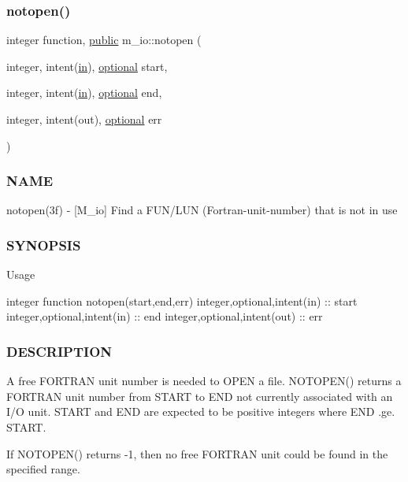 \subsubsection{\texorpdfstring{notopen()}{notopen()}}
{\footnotesize\ttfamily integer function, \hyperlink{M__stopwatch_83_8txt_a2f74811300c361e53b430611a7d1769f}{public} m\+\_\+io\+::notopen (\begin{DoxyParamCaption}\item[{integer, intent(\hyperlink{M__journal_83_8txt_afce72651d1eed785a2132bee863b2f38}{in}), \hyperlink{option__stopwatch_83_8txt_aa4ece75e7acf58a4843f70fe18c3ade5}{optional}}]{start,  }\item[{integer, intent(\hyperlink{M__journal_83_8txt_afce72651d1eed785a2132bee863b2f38}{in}), \hyperlink{option__stopwatch_83_8txt_aa4ece75e7acf58a4843f70fe18c3ade5}{optional}}]{end,  }\item[{integer, intent(out), \hyperlink{option__stopwatch_83_8txt_aa4ece75e7acf58a4843f70fe18c3ade5}{optional}}]{err }\end{DoxyParamCaption})}



\subsubsection*{N\+A\+ME}

notopen(3f) -\/ \mbox{[}M\+\_\+io\mbox{]} Find a F\+U\+N/\+L\+UN (Fortran-\/unit-\/number) that is not in use \subsubsection*{S\+Y\+N\+O\+P\+S\+IS}

Usage

integer function notopen(start,end,err) integer,optional,intent(in) \+:\+: start integer,optional,intent(in) \+:\+: end integer,optional,intent(out) \+:\+: err \subsubsection*{D\+E\+S\+C\+R\+I\+P\+T\+I\+ON}

A free F\+O\+R\+T\+R\+AN unit number is needed to O\+P\+EN a file. N\+O\+T\+O\+P\+E\+N() returns a F\+O\+R\+T\+R\+AN unit number from S\+T\+A\+RT to E\+ND not currently associated with an I/O unit. S\+T\+A\+RT and E\+ND are expected to be positive integers where E\+ND .ge. S\+T\+A\+RT.

If N\+O\+T\+O\+P\+E\+N() returns -\/1, then no free F\+O\+R\+T\+R\+AN unit could be found in the specified range.

